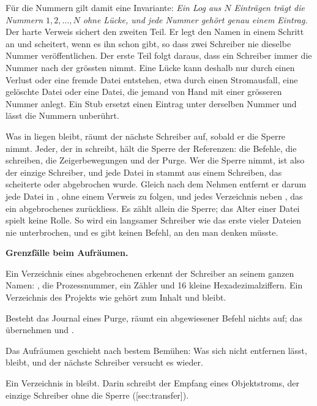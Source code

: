 {Für die Nummern gilt damit eine Invariante:
{\em Ein Log aus $N$ Einträgen trägt die Nummern $1, 2, \ldots, N$ ohne Lücke,
und jede Nummer gehört genau einem Eintrag.}
Der harte Verweis sichert den zweiten Teil.
Er legt den Namen in einem Schritt an und scheitert, wenn es ihn schon gibt,
so dass zwei Schreiber nie dieselbe Nummer veröffentlichen.
Der erste Teil folgt daraus, dass ein Schreiber immer die Nummer nach der grössten nimmt.
Eine Lücke kann deshalb nur durch einen Verlust oder eine fremde Datei entstehen,
etwa durch einen Stromausfall, eine gelöschte Datei
oder eine Datei, die jemand von Hand mit einer grösseren Nummer anlegt.
Ein Stub ersetzt einen Eintrag unter derselben Nummer und lässt die Nummern unberührt.

Was in  liegen bleibt, räumt der nächste Schreiber auf, sobald er die Sperre nimmt.
Jeder, der in  schreibt, hält die Sperre der Referenzen:
die Befehle, die schreiben, die Zeigerbewegungen und der Purge.
Wer die Sperre nimmt, ist also der einzige Schreiber,
und jede Datei in  stammt aus einem Schreiben, das scheiterte oder abgebrochen wurde.
Gleich nach dem Nehmen entfernt er darum jede Datei in , ohne einem Verweis zu folgen,
und jedes Verzeichnis neben , das ein abgebrochenes  zurückliess.
Es zählt allein die Sperre; das Alter einer Datei spielt keine Rolle.
So wird ein langsamer Schreiber wie das erste  vieler Dateien nie unterbrochen,
und es gibt keinen Befehl, an den man denken müsste.

\startinfobox
{\bf Grenzfälle beim Aufräumen.}
\startitemize
\item Ein Verzeichnis eines abgebrochenen  erkennt der Schreiber an seinem ganzen
Namen: , die Prozessnummer, ein Zähler und 16 kleine Hexadezimalziffern.
Ein Verzeichnis des Projekts wie  gehört zum Inhalt und bleibt.
\item Besteht das Journal eines Purge, räumt ein abgewiesener Befehl nichts auf;
das übernehmen  und .
\item Das Aufräumen geschieht nach bestem Bemühen:
Was sich nicht entfernen lässt, bleibt, und der nächste Schreiber versucht es wieder.
\item Ein Verzeichnis in  bleibt.
Darin schreibt der Empfang eines Objektstroms, der einzige Schreiber ohne die Sperre
([sec:transfer]).
\stopitemize
\stopinfobox

}
